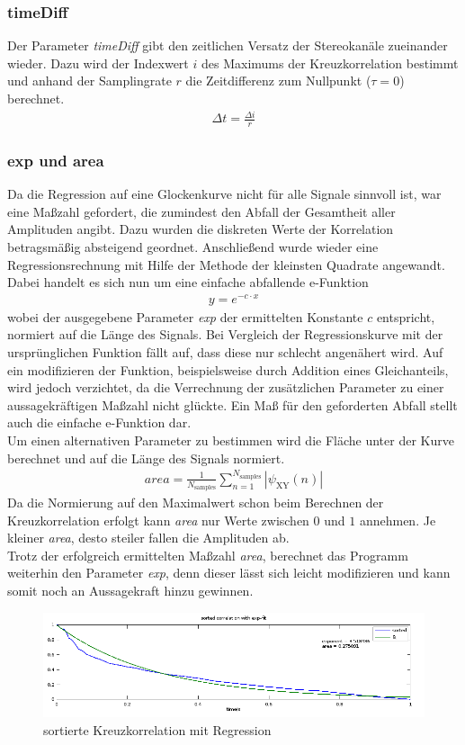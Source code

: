 \subsubsection{timeDiff}
Der Parameter \textit{timeDiff} gibt den zeitlichen Versatz der Stereokanäle zueinander wieder. Dazu wird der Indexwert $i$ des Maximums der Kreuzkorrelation bestimmt und anhand der Samplingrate $r$ die Zeitdifferenz zum Nullpunkt ($\tau = 0$) berechnet.
\begin{align*}
\Delta t = \frac{\Delta i}{r}
\end{align*}
\subsubsection{exp und area}
Da die Regression auf eine Glockenkurve nicht für alle Signale sinnvoll ist, war eine Maßzahl gefordert, die zumindest den Abfall der Gesamtheit aller Amplituden angibt. Dazu wurden die diskreten Werte der Korrelation betragsmäßig absteigend geordnet. Anschließend wurde wieder eine Regressionsrechnung mit Hilfe der Methode der kleinsten Quadrate angewandt. Dabei handelt es sich nun um eine einfache abfallende e-Funktion
\begin{align*}
y = e^{-c \cdot x}
\end{align*}
wobei der ausgegebene Parameter \textit{exp} der ermittelten Konstante $c$ entspricht, normiert auf die Länge des Signals. Bei Vergleich der Regressionskurve mit der ursprünglichen Funktion fällt auf, dass diese nur schlecht angenähert wird. Auf ein modifizieren der Funktion, beispielsweise durch Addition eines Gleichanteils, wird jedoch verzichtet, da die Verrechnung der zusätzlichen Parameter zu einer aussagekräftigen Maßzahl nicht glückte. Ein Maß für den geforderten Abfall stellt auch die einfache e-Funktion dar. 
\\Um einen alternativen Parameter zu bestimmen wird die Fläche unter der Kurve berechnet und auf die Länge des Signals normiert. 
\begin{align*}
area = \frac{1}{N_{\text{samples}}} \sum_{n=1}^{N_{\text{samples}}} |\psi_{\text{XY}}(n)|
\end{align*}
Da die Normierung auf den Maximalwert schon beim Berechnen der Kreuzkorrelation erfolgt kann \textit{area} nur Werte zwischen $0$ und $1$ annehmen. Je kleiner \textit{area}, desto steiler fallen die Amplituden ab. 
\\Trotz der erfolgreich ermittelten Maßzahl \textit{area}, berechnet das Programm weiterhin den Parameter \textit{exp}, denn dieser lässt sich leicht modifizieren und kann somit noch an Aussagekraft hinzu gewinnen. 
\begin{figure}[ht!]
  \centering
  \includegraphics[width=\textwidth, keepaspectratio=true]{img/trefftz_wiese_m_8(s)+1s_exp}
  \caption{sortierte Kreuzkorrelation mit Regression}
\label{exp-Regression}
\end{figure}
